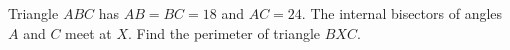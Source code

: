 Triangle $ABC$ has $AB=BC=18$ and $AC=24$. The internal bisectors of angles $A$ and $C$ meet at $X$. Find the perimeter of triangle $BXC$.
